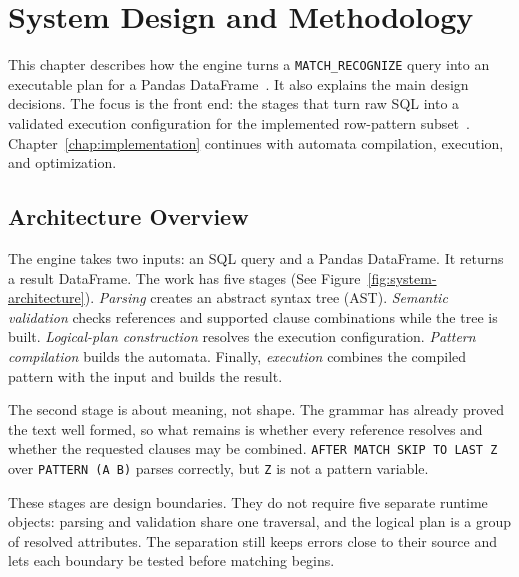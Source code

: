 \providecommand{\mr}{\texttt{MATCH\_RECOGNIZE}}
\chapter{System Design and Methodology}
\label{chap:methodology}

This chapter describes how the engine turns a
\texttt{MATCH\_RECOGNIZE} query into an executable plan for a
Pandas DataFrame~\cite{monierashraf2025rowmatch}.  It also
explains the main design decisions.  The focus is the front end: the
stages that turn raw SQL into a validated execution configuration for
the implemented row-pattern subset~\cite{iso2016}.
Chapter~\ref{chap:implementation} continues with automata compilation,
execution, and optimization.

\section{Architecture Overview}
\label{sec:meth-overview}

The engine takes two inputs: an SQL query and a Pandas
DataFrame.  It returns a result DataFrame.  The work has five stages
(See Figure~\ref{fig:system-architecture}).  \emph{Parsing} creates an
abstract syntax tree (AST).  \emph{Semantic validation} checks
references and supported clause combinations while the tree is built.
\emph{Logical-plan construction} resolves the execution configuration.
\emph{Pattern compilation} builds the automata.  Finally,
\emph{execution} combines the compiled pattern with the input and
builds the result.

The second stage is about meaning, not shape.  The grammar has already
proved the text well formed, so what remains is whether every
reference resolves and whether the requested clauses may be combined.
\texttt{AFTER MATCH SKIP TO LAST Z} over \texttt{PATTERN (A B)} parses
correctly, but \texttt{Z} is not a pattern variable.

These stages are design boundaries.  They do not require five separate
runtime objects: parsing and validation share one traversal, and the
logical plan is a group of resolved attributes.  The separation still
keeps errors close to their source and lets each boundary be tested
before matching begins.


